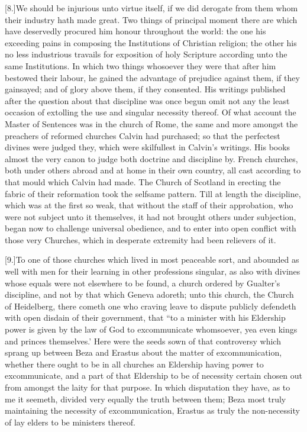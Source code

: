 [8.]We should be injurious unto virtue itself, if we did derogate from them whom their industry hath made great. Two things of principal moment there are which have deservedly procured him honour throughout the world: the one his exceeding pains in composing the Institutions of Christian religion; the other his no less industrious travails for exposition of holy Scripture according unto the same Institutions. In which two things whosoever they were that after him bestowed their labour, he gained the advantage of prejudice against them, if they gainsayed; and of glory above them, if they consented. His writings published after the question about that discipline was once begun omit not any the least occasion of extolling the use and singular necessity thereof. Of what account the Master of Sentences was in the church of Rome, the same and more amongst the preachers of reformed churches Calvin had purchased; so that the perfectest divines were judged they, which were skilfullest in Calvin’s writings. His books almost the very canon to judge both doctrine and discipline by. French churches, both under others abroad and at home in their own country, all cast according to that mould which Calvin had made. The Church of Scotland in erecting the fabric of their reformation took the selfsame pattern. Till at length the discipline, which was at the first so weak, that without the staff of their approbation, who were not subject unto it themselves, it had not brought others under subjection, began now to challenge universal obedience, and to enter into open conflict with those very Churches, which in desperate extremity had been relievers of it.

[9.]To one of those churches which lived in most peaceable sort, and abounded as well with men for their learning in other professions singular, as also with divines whose equals were not elsewhere to be found, a church ordered by Gualter’s discipline, and not by that which Geneva adoreth; unto this church, the Church of Heidelberg, there cometh one who craving leave to dispute publicly defendeth with open disdain of their government, that “to a minister with his Eldership power is given by the law of God to excommunicate whomsoever, yea even kings and princes themselves.’ Here were the seeds sown of that controversy which sprang up between Beza and Erastus about the matter of excommunication, whether there ought to be in all churches an Eldership having power to excommunicate, and a part of that Eldership to be of necessity certain chosen out from amongst the laity for that purpose. In which disputation they have, as to me it seemeth, divided very equally the truth between them; Beza most truly maintaining the necessity of excommunication, Erastus as truly the non-necessity of lay elders to be ministers thereof.

